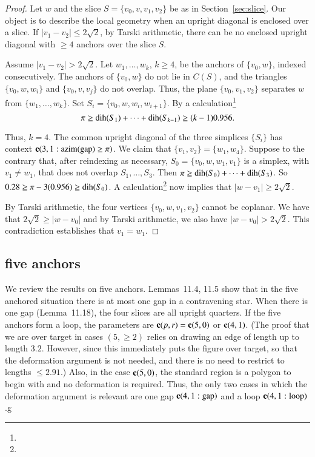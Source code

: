 \begin{proof}
Let $w$ and the
slice $S=\{v_0,v,v_1,v_2\}$ be as in Section~\ref{sec:slice}.
Our object is to describe the local geometry when an upright
diagonal is enclosed over a slice. If $|v_1-v_2|\le
2\sqrt{2}$, by Tarski arithmetic,
there can be no enclosed upright diagonal with $\ge 4$ anchors
over the slice $S$.

Assume  $|v_1-v_2|>2\sqrt{2}$. Let $w_1,\ldots,w_k$, $k\ge4$, be the
anchors of $\{v_0,w\}$, indexed consecutively. The anchors of $\{v_0,w\}$ do not
lie in $C(S)$, and the triangles $\{v_0,w,w_i\}$ and $\{v_0,v,v_j\}$ do not
overlap. Thus, the plane $\{v_0,v_1,v_2\}$ separates $w$ from
$\{w_1,\ldots,w_k\}$. Set $S_i=\{v_0,w,w_i,w_{i+1}\}$.
By a calculation\footnote{} %
    $$\pi\ge \operatorname{dih}(S_1)+\cdots+\operatorname{dih}(S_{k-1})\ge (k-1)0.956.$$

Thus, $k=4$. The common upright diagonal  of the three simplices
$\{S_i\}$ has context {\it ${\operatorname{\bf c}}{(3,1: {\operatorname{azim}}({\operatorname{gap}}) \ge \pi)}$}.  We claim that
$\{v_1,v_2\}=\{w_1,w_4\}$. Suppose to the contrary that, after
reindexing as necessary, $S_0=\{v_0,w,w_1,v_1\}$ is a simplex, with
$v_1\ne w_1$, that does not overlap $S_1,\ldots,S_3$. Then $\pi\ge
\operatorname{dih}(S_0)+\cdots+\operatorname{dih}(S_3)$. So
    $0.28\ge \pi-3(0.956)\ge \operatorname{dih}(S_0)$.
A calculation\footnote{} %
now implies that $|w-v_1|\ge 2\sqrt{2}$.

By Tarski arithmetic, the four vertices
$\{v_0,w,v_1,v_2\}$ cannot be coplanar.
We have that $2\sqrt{2}\ge|w-v_0|$ and by Tarski arithmetic,
we also have $|w-v_0|>2\sqrt2$.
This contradiction establishes that $v_1=w_1$.
\end{proof}





\subsection{five anchors}


We review the results on five anchors. 
Lemmas~11.4, 11.5 show that in the five anchored situation there is at most one  gap in a contravening star.  When there is one  gap (Lemma~11.18), the four slices are all upright quarters. If the five anchors form a loop, the parameters are ${\operatorname{\bf c}}{(p,r)}={\operatorname{\bf c}}{(5,0)}$ or ${\operatorname{\bf c}}{(4,1)}$.  (The proof that we are over target in cases $(5,\ge2)$ relies on drawing an edge of length up to length $3.2$.  However, since this immediately puts the figure over target, so that the deformation argument is not needed, and there is no need to restrict to lengths $\le 2.91$.) Also, in the case ${\operatorname{\bf c}}{(5,0)}$, the standard region is a polygon to begin with and no deformation is required.  Thus, the only two cases in which the deformation argument is relevant are one  gap ${\operatorname{\bf c}}{(4,1:{\operatorname{gap}})}$ and a loop ${\operatorname{\bf c}}{(4,1:{\operatorname{loop}})}$.g

